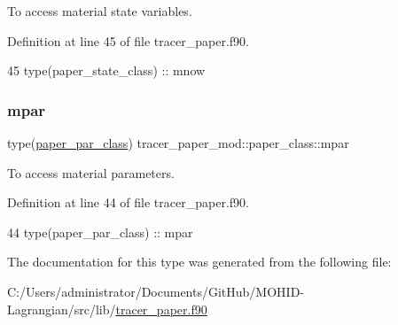 To access material state variables. 



Definition at line 45 of file tracer\+\_\+paper.\+f90.


\begin{DoxyCode}
45         \textcolor{keywordtype}{type}(paper\_state\_class) :: mnow
\end{DoxyCode}
\mbox{\label{structtracer__paper__mod_1_1paper__class_a23ace4a6e578ffccaf1d5dcd91dc09b3}} 
\subsubsection{\texorpdfstring{mpar}{mpar}}
{\footnotesize\ttfamily type(\mbox{\hyperlink{structtracer__paper__mod_1_1paper__par__class}{paper\+\_\+par\+\_\+class}}) tracer\+\_\+paper\+\_\+mod\+::paper\+\_\+class\+::mpar\hspace{0.3cm}{\ttfamily [private]}}



To access material parameters. 



Definition at line 44 of file tracer\+\_\+paper.\+f90.


\begin{DoxyCode}
44         \textcolor{keywordtype}{type}(paper\_par\_class)   :: mpar
\end{DoxyCode}


The documentation for this type was generated from the following file\+:\begin{DoxyCompactItemize}
\item 
C\+:/\+Users/administrator/\+Documents/\+Git\+Hub/\+M\+O\+H\+I\+D-\/\+Lagrangian/src/lib/\mbox{\hyperlink{tracer__paper_8f90}{tracer\+\_\+paper.\+f90}}\end{DoxyCompactItemize}
